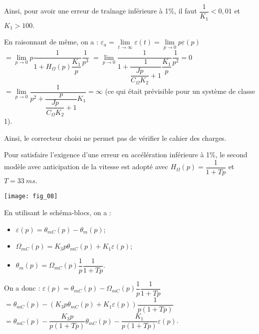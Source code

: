 \begin{multicols}{2}
\begin{corrige}
Ainsi, pour avoir une erreur de traînage inférieure à 1\%, il faut $\dfrac{1}{K_1}<0,01$ et $K_1 >100$.
\end{corrige}
\else
\fi









\ifprof

\begin{corrige}
En raisonnant de même, on a :
 $\varepsilon_a = \lim\limits_{t\to \infty} \varepsilon(t)= \lim\limits_{p\to 0} p\varepsilon(p) $ $= \lim\limits_{p\to 0} p \dfrac{ 1}{ 1+H_{\Omega}(p) \dfrac{K_1}{p}} \dfrac {1}{p^3}$
$= \lim\limits_{p\to 0} \dfrac{ 1}{ 1+\dfrac{1}{\dfrac{Jp}{C_{\Omega} K_2}+1 } \dfrac{K_1}{p}}\dfrac {1}{p^2} = 0$
$= \lim\limits_{p\to 0} \dfrac{ 1}{ p^2+\dfrac{p}{\dfrac{Jp}{C_{\Omega} K_2}+1 } K_1}= \infty$ (ce qui était prévisible pour un système de classe 1).


Ainsi, le correcteur choisi ne permet pas de vérifier le cahier des charges. 
\end{corrige}
\else
\fi

\ifprof
\else
Pour satisfaire l’exigence d’une erreur en accélération inférieure à 1\%, le second modèle avec anticipation de la
vitesse est adopté avec $H_{\Omega}(p)=\dfrac{1}{1+Tp}$ et $T=\SI{33}{ms}$.

\begin{center}
\texttt{[image: fig\_08]}
\end{center}
\fi

\ifprof

\begin{corrige}
En utilisant le schéma-blocs, on a : 
\begin{itemize}
\item 
$ \varepsilon(p)=\theta_{mC}(p)-\theta_{m}(p)$;
\item  $\Omega_{mC}(p)=K_3 p \theta_{mC}(p) + K_1 \varepsilon(p)$;
\item $\theta_m(p)=\Omega_{mC}(p) \dfrac{1}{p}\dfrac{1}{1+Tp}$. 
\end{itemize}
On a donc : 
$ \varepsilon(p)=\theta_{mC}(p)-\Omega_{mC}(p) \dfrac{1}{p}\dfrac{1}{1+Tp}$ 
$= \theta_{mC}(p)- 
\left(K_3 p \theta_{mC}(p) + K_1 \varepsilon(p)  \right)
\dfrac{1}{p \left( 1+Tp\right)}$
$= \theta_{mC}(p)- 
 \dfrac{K_3 p }{p \left( 1+Tp\right)} \theta_{mC}(p)
-  \dfrac{K_1 }{p \left( 1+Tp\right)} \varepsilon(p)
$. 


\end{corrige}
\end{multicols}
